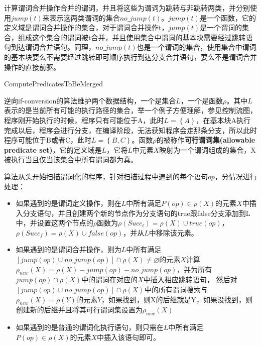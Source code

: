 计算谓词合并操作合并的谓词，并且将这些为谓词为跳转与非跳转两类，并分别使用$jump\left(t\right)$来表示这两类谓词的集合$no\_jump\left(t\right)$。$jump\left(t\right)$是一个函数，它的定义域是谓词合并操作的集合，对于谓词合并操作t，$jump\left(t\right)$是一个谓词的集合，组成这个集合的谓词被t合并，并且使用集合中谓词的基本块需要经过跳转语句到达谓词合并语句。同理，$no\_jump\left(t\right)$也是一个谓词的集合，使用集合中谓词的基本块要么不需要经过跳转即可顺序执行到达分支合并语句，要么不是谓词合并操作的直接前驱。

\begin{algorithm}[H]
	\label{alg:mergedp}
	\caption{ComputePredicatesToBeMerged}
\end{algorithm}

逆向if-conversion的算法维护两个数据结构，一个是集合$L$，一个是函数$\rho$。其中$L$表示的是当前所有可能的执行路径的集合，举一个例子方便理解，参见控制流图，程序刚开始执行的时候，程序只有可能位于A，此时$L=\left\{A\right\}$，在基本块A执行完成以后，程序会进行分支，在编译阶段，无法获知程序会走那条分支，所以此时程序可能位于B或者C，此时$L=\left\{B,C\right\}$。函数$\rho$的被称作\textbf{可行谓词集(allowable predicate set)}，它的定义域是$L$，它将$L$中元素$X$映射为一个谓词组成的集合，X被执行当且仅当该集合中所有谓词都为真。

算法从头开始扫描谓词化的程序，针对扫描过程中遇到的每个语句$op$，分情况进行处理：
\begin{itemize}
\item 如果遇到的是谓词定义操作，则在$L$中所有满足$P\left(op\right)\in\rho\left(X\right)$的元素$X$中插入分支语句，并且创建两个新的节点作为分支语句的true跟false分支添加到L中，并设置这两个节点的$\rho$函数为$\rho\left(Succ_t\right)=\rho\left(X\right)\cup true\left(op\right)$，$\rho\left(Succ_f\right)=\rho\left(X\right)\cup false\left(op\right)$，并从$L$中移除该元素。
\item 如果遇到的是谓词合并操作，则为$L$中所有满足$\left[jump\left(op\right)\cup no\_jump\left(op\right)\right]\cap\rho\left(X\right)\neq\varnothing$的元素$X$计算$\rho_{new}\left(X\right)=\rho\left(X\right)-jump\left(op\right)-no\_jump\left(op\right)$，并为所有$jump\left(op\right)\cap\rho\left(X\right)$中的谓词在对应的$X$中插入相应跳转语句， 然后对$\left[jump\left(op\right)\cup no\_jump\left(op\right)\right]\cap\rho\left(X\right)$中的所有谓词搜索与$\rho_{new}\left(X\right)=\rho\left(Y\right)$的元素$Y$，如果找到，则X的后继就是Y，如果没找到，则创建新的后继并且将其可行谓词集设置为$\rho_{new}\left(X\right)$
\item 如果遇到的是普通的谓词化执行语句，则只需在$L$中所有满足$P\left(op\right)\in\rho\left(X\right)$的元素$X$中插入该语句即可。
\end{itemize}


